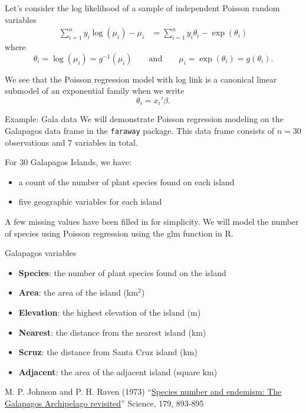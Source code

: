 \documentclass[
  ignorenonframetext,
]{beamer}
\providecommand{\tightlist}{%
  \setlength{\itemsep}{0pt}\setlength{\parskip}{0pt}}
\begin{document}
\begin{frame}{}
\protect\hypertarget{section-2}{}
Let's consider the log likelihood of a sample of independent Poisson
random variables \begin{align*}
  \sum_{i=1}^n y_i\log(\mu_i) - \mu_i 
    &=  \sum_{i=1}^n y_i\theta_i - \exp(\theta_i)
\end{align*} where \[
  \theta_i = \log\left(\mu_i\right) = g^{-1}(\mu_i) \qquad \text{and} \qquad \mu_i = \exp(\theta_i) = g(\theta_i).
\]

We see that the Poisson regression model with log link is a canonical
linear submodel of an exponential family when we write \[
  \theta_i = x_i'\beta.
\]
\end{frame}

\begin{frame}{Example: Gala data}
\protect\hypertarget{example-gala-data}{}
We will demonstrate Poisson regression modeling on the Galapagos data
frame in the \texttt{faraway} package. This data frame consists of
\(n = 30\) observations and \(7\) variables in total.

\vspace{12pt}

For 30 Galapagos Islands, we have:

\begin{itemize}
\tightlist
\item
  a count of the number of plant species found on each island
\item
  five geographic variables for each island
\end{itemize}

\vspace{12pt}

A few missing values have been filled in for simplicity. We will model
the number of species using Poisson regression using the glm function in
R.
\end{frame}

\begin{frame}{Galapagos variables}
\protect\hypertarget{galapagos-variables}{}
\begin{itemize}
\tightlist
\item
  \textbf{Species}: the number of plant species found on the island
\item
  \textbf{Area}: the area of the island (km\(^2\))
\item
  \textbf{Elevation}: the highest elevation of the island (m)
\item
  \textbf{Nearest}: the distance from the nearest island (km)
\item
  \textbf{Scruz}: the distance from Santa Cruz island (km)
\item
  \textbf{Adjacent}: the area of the adjacent island (square km)
\end{itemize}

\vspace{12pt}

M. P. Johnson and P. H. Raven (1973)
``\href{https://pubmed.ncbi.nlm.nih.gov/17832770/}{Species number and
endemism: The Galapagos Archipelago revisited}'' Science, 179, 893-895
\end{frame}
\end{document}

